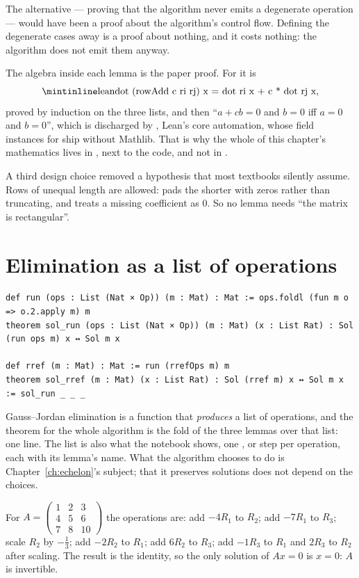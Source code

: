 The alternative --- proving that the algorithm never emits a degenerate operation --- would have
been a proof about the algorithm's control flow. Defining the degenerate cases away is a proof
about nothing, and it costs nothing: the algorithm does not emit them anyway.

The algebra inside each lemma is the paper proof. For  it is
\[
  \lc{dot (rowAdd c ri rj) x = dot ri x + c * dot rj x},
\]
proved by induction on the three lists, and then ``$a + cb = 0$ and $b = 0$ iff $a = 0$ and
$b = 0$'', which is discharged by , Lean's core automation, whose field instances for
 ship without Mathlib. That is why the whole of this chapter's mathematics lives in
, next to the code, and not in .

A third design choice removed a hypothesis that most textbooks silently assume. Rows of unequal
length are allowed:  pads the shorter with zeros rather than truncating, and 
treats a missing coefficient as $0$. So no lemma needs ``the matrix is rectangular''.

\section{Elimination as a list of operations}

\begin{verbatim}
def run (ops : List (Nat × Op)) (m : Mat) : Mat := ops.foldl (fun m o => o.2.apply m) m
theorem sol_run (ops : List (Nat × Op)) (m : Mat) (x : List Rat) : Sol (run ops m) x ↔ Sol m x

def rref (m : Mat) : Mat := run (rrefOps m) m
theorem sol_rref (m : Mat) (x : List Rat) : Sol (rref m) x ↔ Sol m x := sol_run _ _ _
\end{verbatim}

Gauss--Jordan elimination is a function that \emph{produces} a list of operations, and the
theorem for the whole algorithm is the fold of the three lemmas over that list: one line. The
list is also what the notebook shows, one ,  or
 step per operation, each with its lemma's name. What the algorithm chooses to
do is Chapter~\ref{ch:echelon}'s subject; that it preserves solutions does not depend on the
choices.

\begin{exbox}
  For $A = \begin{pmatrix} 1 & 2 & 3 \\ 4 & 5 & 6 \\ 7 & 8 & 10 \end{pmatrix}$ the operations are:
  add $-4 R_1$ to $R_2$; add $-7 R_1$ to $R_3$; scale $R_2$ by $-\frac{1}{3}$; add $-2R_2$ to
  $R_1$; add $6 R_2$ to $R_3$; add $-1 R_3$ to $R_1$ and $2 R_3$ to $R_2$ after scaling. The
  result is the identity, so the only solution of $Ax = 0$ is $x = 0$: $A$ is invertible.
\end{exbox}

